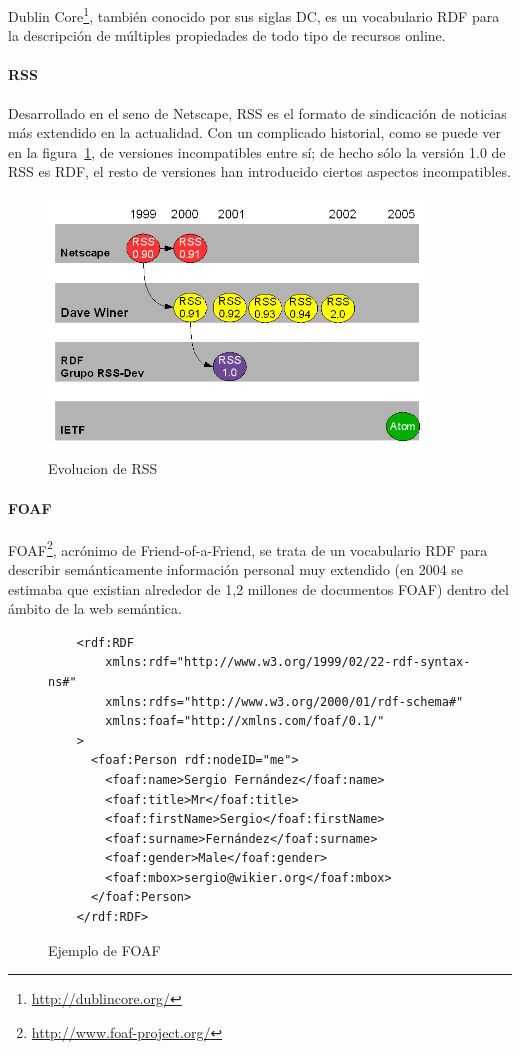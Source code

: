 Dublin Core\footnote{\url{http://dublincore.org/}}, también conocido por sus siglas DC,
es un vocabulario RDF para la descripción de múltiples propiedades de todo tipo de 
recursos online.

\paragraph{RSS}

Desarrollado en el seno de Netscape, RSS es el formato de sindicación de noticias
más extendido en la actualidad. Con un complicado historial, como se puede ver en la
figura~\ref{fig:rssEvolution}, de versiones incompatibles entre sí; de hecho sólo 
la versión 1.0 de RSS es RDF, el resto de versiones han introducido ciertos aspectos
incompatibles.

\begin{figure}[p]
	\centering
	\includegraphics[width=10cm]{images/rssEvolution.png}
	\caption{Evolucion de RSS}
	\label{fig:rssEvolution}
\end{figure}

\paragraph{FOAF}

FOAF\footnote{\url{http://www.foaf-project.org/}}, acrónimo de Friend-of-a-Friend, 
se trata de un vocabulario RDF para describir semánticamente información personal
muy extendido (en 2004 se estimaba\cite{Li2005} que existian alrededor de 1,2 millones 
de documentos FOAF) dentro del ámbito de la web semántica.

\begin{figure} [tp]
\begin{verbatim}
	<rdf:RDF
		xmlns:rdf="http://www.w3.org/1999/02/22-rdf-syntax-ns#"
		xmlns:rdfs="http://www.w3.org/2000/01/rdf-schema#"
		xmlns:foaf="http://xmlns.com/foaf/0.1/"
	>
	  <foaf:Person rdf:nodeID="me">
	    <foaf:name>Sergio Fernández</foaf:name>
	    <foaf:title>Mr</foaf:title>
	    <foaf:firstName>Sergio</foaf:firstName>
	    <foaf:surname>Fernández</foaf:surname>
	    <foaf:gender>Male</foaf:gender>
	    <foaf:mbox>sergio@wikier.org</foaf:mbox>
	  </foaf:Person>
	</rdf:RDF>
\end{verbatim}
	\caption{Ejemplo de FOAF}
	\label{fig:ejemplo.foaf}
\end{figure}

